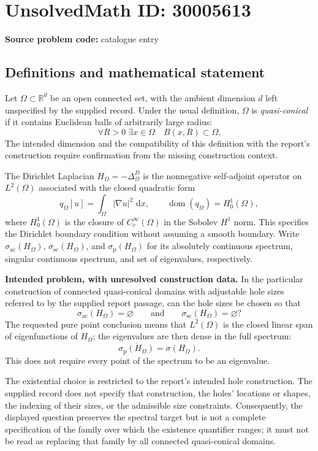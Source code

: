 \documentclass[11pt]{article}
\newcommand{\R}{\mathbb{R}}
\newcommand{\dd}{\,\mathrm{d}}
\begin{document}
\section*{UnsolvedMath ID: 30005613}
\textbf{Source problem code:} catalogue entry
\subsection{Definitions and mathematical statement}
Let \(\Omega\subset\R^d\) be an open connected set, with the ambient dimension \(d\) left unspecified by the supplied record. Under the usual definition, \(\Omega\) is \emph{quasi-conical} if it contains Euclidean balls of arbitrarily large radius:
\[
\forall R>0\;\exists x\in\Omega\quad B(x,R)\subset\Omega.
\]
The intended dimension and the compatibility of this definition with the report's construction require confirmation from the missing construction context.

The Dirichlet Laplacian \(H_\Omega=-\Delta_\Omega^D\) is the nonnegative self-adjoint operator on \(L^2(\Omega)\) associated with the closed quadratic form
\[
q_\Omega[u]=\int_\Omega |\nabla u|^2\,\dd x,
\qquad \operatorname{dom}(q_\Omega)=H_0^1(\Omega),
\]
where \(H_0^1(\Omega)\) is the closure of \(C_c^\infty(\Omega)\) in the Sobolev \(H^1\) norm. This specifies the Dirichlet boundary condition without assuming a smooth boundary. Write \(\sigma_{\mathrm{ac}}(H_\Omega)\), \(\sigma_{\mathrm{sc}}(H_\Omega)\), and \(\sigma_{\mathrm p}(H_\Omega)\) for its absolutely continuous spectrum, singular continuous spectrum, and set of eigenvalues, respectively.

\textbf{Intended problem, with unresolved construction data.} In the particular construction of connected quasi-conical domains with adjustable hole sizes referred to by the supplied report passage, can the hole sizes be chosen so that
\[
\sigma_{\mathrm{ac}}(H_\Omega)=\varnothing
\qquad\text{and}\qquad
\sigma_{\mathrm{sc}}(H_\Omega)=\varnothing?
\]
The requested pure point conclusion means that \(L^2(\Omega)\) is the closed linear span of eigenfunctions of \(H_\Omega\); the eigenvalues are then dense in the full spectrum:
\[
\overline{\sigma_{\mathrm p}(H_\Omega)}=\sigma(H_\Omega).
\]
This does not require every point of the spectrum to be an eigenvalue.

The existential choice is restricted to the report's intended hole construction. The supplied record does not specify that construction, the holes' locations or shapes, the indexing of their sizes, or the admissible size constraints. Consequently, the displayed question preserves the spectral target but is not a complete specification of the family over which the existence quantifier ranges; it must not be read as replacing that family by all connected quasi-conical domains.
\end{document}
